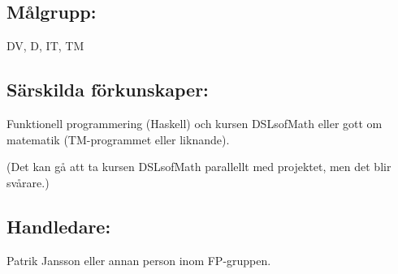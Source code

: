 \documentclass{article}
\begin{document}
\subsection{Målgrupp:}\label{muxe5lgrupp}

DV, D, IT, TM

\subsection{Särskilda förkunskaper:}\label{suxe4rskilda-fuxf6rkunskaper}

Funktionell programmering (Haskell) och kursen DSLsofMath eller gott om
matematik (TM-programmet eller liknande).

(Det kan gå att ta kursen DSLsofMath parallellt med projektet, men det
blir svårare.)

\subsection{Handledare:}\label{handledare}

Patrik Jansson eller annan person inom FP-gruppen.
\end{document}
